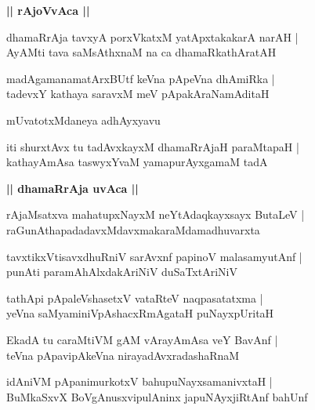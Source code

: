 \documentclass[twoside,12pt,openright]{book}
\newcounter{shloka}[chapter]
\def\uvaca#1{\centerline{{\large\textbf{#1}}}}
\begin{document}
\uvaca{|| rAjoVvAca ||}

\begin{shloka}%
dhamaRrAja tavxyA porxVkatxM yatApxtakakarA narAH |\\
AyAMti tava saMsAthxnaM na ca dhamaRkathAratAH 
\end{shloka}

\begin{shloka}%
madAgamanamatArxBUtf keVna pApeVna dhAmiRka |\\
tadevxY kathaya saravxM meV pApakAraNamAditaH
\end{shloka}

\begin{center}
mUvatotxMdaneya adhAyxyavu
\end{center}

\begin{shloka}%
iti shurxtAvx tu tadAvxkayxM dhamaRrAjaH paraMtapaH |\\
kathayAmAsa taswyxYvaM yamapurAyxgamaM tadA 
\end{shloka}

\uvaca{|| dhamaRrAja uvAca ||}

\begin{shloka}%
rAjaMsatxva mahatupxNayxM neYtAdaqkayxsayx ButaLeV |\\
raGunAthapadadavxMdavxmakaraMdamadhuvarxta
\end{shloka}

\begin{shloka}%
tavxtikxVtisavxdhuRniV sarAvxnf papinoV malasamyutAnf |\\
punAti paramAhAlxdakAriNiV duSaTxtAriNiV 
\end{shloka}

\begin{shloka}%
tathApi pApaleVshasetxV vataRteV naqpasatatxma |\\
yeVna saMyaminiVpAshacxRmAgataH puNayxpUritaH
\end{shloka}

\begin{shloka}%
EkadA tu caraMtiVM gAM vArayAmAsa veY BavAnf |\\
teVna pApavipAkeVna nirayadAvxradashaRnaM 
\end{shloka}

\begin{shloka}%
idAniVM pApanimurkotxV bahupuNayxsamanivxtaH |\\
BuMkaSxvX BoVgAnusxvipulAninx japuNAyxjiRtAnf bahUnf 
\end{shloka}
\end{document}
